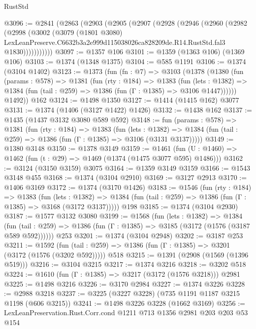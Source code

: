 \begin{lexlean}{RustStd}
\begin{coremodule}
@3096 := @2841
    (@2863
      (@2903
        (@2905
          (@2907
            (@2928
              (@2946
                (@2960
                  (@2982
                    (@2998
                      (@3002
                        (@3079
                          (@1801 @3080)
                          LexLeanPreserve.C6632b3a2e999d115038026ca828209de.R14.RustStd.fal3
                          @1830)))))))))))
@3097 := @1357 @106
@3101 := @1359 (@1363 @106) (@1369 @106)
@3103 := @1374 (@1348 @1375)
@3104 := @585 @1191
@3106 := @1374 (@3104 @1402)
@3123 := @1373
    (fun (fn : @7) =>
    @3103
      (@1378
        (@1380
          (fun (params : @578) =>
          @1381
            (fun (rty : @184) =>
            @1383
              (fun (lets : @1382) =>
              @1384 (fun (tail : @259) => @1386 (fun (Γ : @1385) => @3106 @1447))))))
        @1492))
    @162
@3124 := @1498 @1350
@3127 := @1414 (@1415 @162) @3077
@3131 := @1374 (@1406 (@3127 @1422) @1426)
@3132 := @1438 @162
@3137 := @1435 (@1437 @3132 @3080 @589 @592)
@3148 := fun (params : @578) =>
  @1381
    (fun (rty : @184) =>
    @1383
      (fun (lets : @1382) =>
      @1384 (fun (tail : @259) => @1386 (fun (Γ : @1385) => @3106 (@3131 @3137)))))
@3149 := @1380 @3148
@3150 := @1378 @3149
@3159 := @1461 (fun (U : @1460) => @1462 (fun (t : @29) => @1469 (@1374 (@1475 @3077 @595) @1486)))
@3162 := @3124 (@3150 @3159) @3075
@3164 := @1359 @3149 @3159
@3166 := @1543 @3148 @455
@3168 := @1374 (@3104 @2910)
@3169 := @3127 @2913
@3170 := @1406 @3169
@3172 := @1374 (@3170 @1426)
@3183 := @1546
    (fun (rty : @184) =>
    @1383
      (fun (lets : @1382) =>
      @1384 (fun (tail : @259) => @1386 (fun (Γ : @1385) => @3168 (@3172 @3137)))))
    @198
@3185 := @1374 (@3104 @2930)
@3187 := @1577 @3132 @3080
@3199 := @1568
    (fun (lets : @1382) =>
    @1384 (fun (tail : @259) => @1386 (fun (Γ : @1385) => @3185 (@3172 (@1576 (@3187 @589 @592))))))
    @253
@3201 := @1374 (@3104 @2948)
@3202 := @3187 @253
@3211 := @1592
    (fun (tail : @259) => @1386 (fun (Γ : @1385) => @3201 (@3172 (@1576 (@3202 @592)))))
    @518
@3215 := @1391 (@2908 (@1569 (@1396 @519)))
@3216 := @3104 @3215
@3217 := @1374 @3216
@3218 := @3202 @518
@3224 := @1610 (fun (Γ : @1385) => @3217 (@3172 (@1576 @3218))) @2981
@3225 := @1498 @3216
@3226 := @3170 @2984
@3227 := @1374 @3226
@3228 := @2988 @3218
@3237 := @3225 (@3227 @3228) (@735 @1191 @1187 @3215 @1198 (@606 @3215))
@3241 := @1498 @3226 @3228 (@1662 @3169)
@3256 := LexLeanPreservation.Rust.Corr.cond
    @1211
    @713
    @1356
    @2981
    @203
    @203
    @53
    @154

\end{coremodule}
\end{lexlean}

